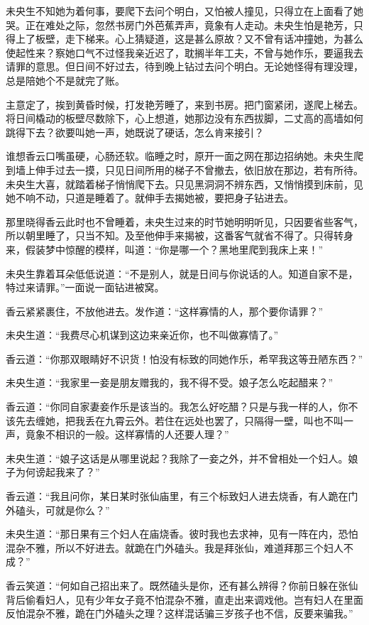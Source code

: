 \documentclass[a4paper,12pt,UTF8,twoside]{ctexbook}
\begin{document}
未央生不知她为着何事，要爬下去问个明白，又怕被人撞见，只得立在上面看了她哭。正在难处之际，忽然书房门外芭蕉弄声，竟象有人走动。未央生怕是艳芳，只得上了板壁，走下梯来。心上猜疑道，这是甚么原故？又不曾有话冲撞她，为甚么使起性来？察她口气不过怪我亲近迟了，耽搁半年工夫，不曾与她作乐，要逼我去请罪的意思。但日间不好过去，待到晚上钻过去问个明白。无论她怪得有理没理，总是陪她个不是就完了账。

主意定了，挨到黄昏时候，打发艳芳睡了，来到书房。把门窗紧闭，遂爬上梯去。将日间橇动的板壁尽数除下，心上想道，她那边没有东西拔脚，二丈高的高墙如何跳得下去？欲要叫她一声，她既说了硬话，怎么肯来接引？

谁想香云口嘴虽硬，心肠还软。临睡之时，原开一面之网在那边招纳她。未央生爬到墙上伸手过去一摸，只见日间所用的梯子不曾撤去，依旧放在那边，若有所待。未央生大喜，就踏着梯子悄悄爬下去。只见黑洞洞不辨东西，又悄悄摸到床前，见她不响不动，只道是睡着了。就伸手去揭她被，要把身子钻进去。

那里晓得香云此时也不曾睡着，未央生过来的时节她明明听见，只因要省些客气，所以朝里睡了，只当不知。及至他伸手来揭被，这番客气就省不得了。只得转身来，假装梦中惊醒的模样，叫道：“你是哪一个？黑地里爬到我床上来！”

未央生靠着耳朵低低说道：“不是别人，就是日间与你说话的人。知道自家不是，特过来请罪。”一面说一面钻进被窝。

香云紧紧裹住，不放他进去。发作道：“这样寡情的人，那个要你请罪？”

未央生道：“我费尽心机谋到这边来亲近你，也不叫做寡情了。”

香云道：“你那双眼睛好不识货！怕没有标致的同她作乐，希罕我这等丑陋东西？”

未央生道：“我家里一妾是朋友赠我的，我不得不受。娘子怎么吃起醋来？”

香云道：“你同自家妻妾作乐是该当的。我怎么好吃醋？只是与我一样的人，你不该先去缠她，把我丢在九霄云外。若住在远处也罢了，只隔得一壁，叫也不叫一声，竟象不相识的一般。这样寡情的人还要人理？”

未央生道：“娘子这话是从哪里说起？我除了一妾之外，并不曾相处一个妇人。娘子为何谤起我来了？”

香云道：“我且问你，某日某时张仙庙里，有三个标致妇人进去烧香，有人跪在门外磕头，可就是你么？”

未央生道：“那日果有三个妇人在庙烧香。彼时我也去求神，见有一阵在内，恐怕混杂不雅，所以不好进去。就跪在门外磕头。我是拜张仙，难道拜那三个妇人不成？”

香云笑道：“何如自己招出来了。既然磕头是你，还有甚么辨得？你前日躲在张仙背后偷看妇人，见有少年女子竟不怕混杂不雅，直走出来调戏他。岂有妇人在里面反怕混杂不雅，跪在门外磕头之理？这样混话骗三岁孩子也不信，反要来骗我。”
\end{document}
